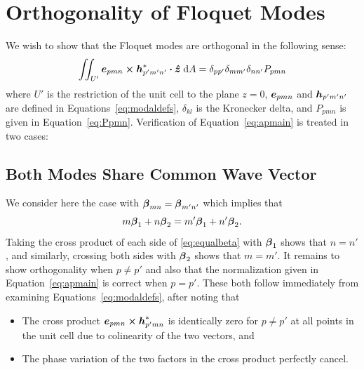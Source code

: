\documentclass[
letterpaper, %
11pt, %
oneside, 
onecolumn, %
openany, %
]{memoir}
\numberwithin{equation}{chapter}
\numberwithin{figure}{chapter}
\begin{document}
\chapter{Orthogonality of Floquet Modes}

\label{app:orthogonal}
We wish to show that the Floquet modes are orthogonal in the following
sense:
\begin{equation}
  \label{eq:apmain}
  \iint_{U'}
  \boldsymbol{e}_{pmn} \boldsymbol{\times} \boldsymbol{h}_{p'm'n'}^* \boldsymbol{\cdot} \boldsymbol{\hat{z}} \; \text{d} A  
    = \delta_{pp'} \delta_{mm'} \delta_{nn'} P_{pmn} 
\end{equation}
where $U'$ is the restriction of the unit cell to the plane $z=0$,
$\boldsymbol{e}_{pmn}$ and $\boldsymbol{h}_{p'm'n'}$ are defined in
Equations~\eqref{eq:modaldefs}, 
$\delta_{kl}$ is the Kronecker delta, and $P_{pmn}$ 
is given in Equation~\eqref{eq:Ppmn}.
Verification of Equation~\eqref{eq:apmain} is treated in two cases:



\section{Both Modes Share Common Wave Vector}
We consider here the case with 
$\boldsymbol{\beta}_{mn}= \boldsymbol{\beta}_{m'n'}$
which implies that
\begin{equation}
  m\boldsymbol{\beta}_1 + n\boldsymbol{\beta}_2 = m'\boldsymbol{\beta}_1 + n'\boldsymbol{\beta}_2.
  \label{eq:equalbeta}
\end{equation}
Taking the cross product of each side of \eqref{eq:equalbeta} with
$\boldsymbol{\beta}_1$ shows that $n=n'$, and similarly, crossing both sides
with $\boldsymbol{\beta}_2$ shows that $m=m'$.
It remains to show orthogonality when $p\neq p'$ and also
that the normalization given in Equation~\eqref{eq:apmain} is
correct when $p=p'$.  These both follow immediately from examining
Equations~\eqref{eq:modaldefs}, after noting that 
\begin{itemize}
\item The cross product 
  $\boldsymbol{e}_{pmn} \boldsymbol{\times} \boldsymbol{h}_{p'mn}^*$ is identically zero for $p\neq p'$ 
  at all points in the unit cell due to colinearity of the two vectors,
  and
\item The phase variation of the two factors in the cross product
  perfectly cancel.
\end{itemize}
\end{document}
